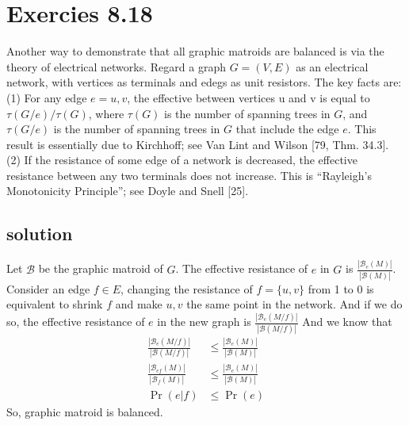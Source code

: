 \documentclass{article}
\begin{document}
\section{Exercies 8.18}
Another way to demonstrate that all graphic matroids are balanced is via the theory of electrical networks. Regard a graph $G = (V, E)$ as an electrical network, with vertices as terminals and edegs as unit resistors. The key facts are: (1) For any edge $e = {u,v}$, the effective between vertices u and v is equal to $\tau(G/e)/\tau(G)$, where $\tau(G)$ is the number of spanning trees in $G$, and $\tau(G/e)$ is the number of spanning trees in $G$ that include the edge $e$. This result is essentially due to Kirchhoff; see Van Lint and Wilson [79, Thm. 34.3]. (2) If the resistance of some edge of a network is decreased, the effective resistance between any two terminals does not increase. This is “Rayleigh’s Monotonicity Principle”; see Doyle and Snell [25].

\subsection{solution}
Let $\mathcal{B}$ be the graphic matroid of $G$.
The effective resistance of $e$ in $G$ is $\frac{|\mathcal{B}_e(M)|}{|\mathcal{B}(M)|}$.
Consider an edge $f\in E$, changing the resistance of $f = \{u, v\}$ from 1 to 0 is equivalent to shrink $f$
and make $u, v$ the same point in the network. And if we do so, the effective resistance of $e$ in the new graph is
$\frac{|\mathcal{B}_e(M/f)|}{|\mathcal{B}(M/f)|}$
And we know that
\begin{align*}
  \frac{|\mathcal{B}_e(M/f)|}{|\mathcal{B}(M/f)|} &\leq \frac{|\mathcal{B}_e(M)|}{|\mathcal{B}(M)|} \\
  \frac{|\mathcal{B}_{ef}(M)|}{|\mathcal{B}_f(M)|} &\leq \frac{|\mathcal{B}_e(M)|}{|\mathcal{B}(M)|} \\
  \Pr(e|f) &\leq \Pr(e)
\end{align*}
So, graphic matroid is balanced.
\end{document}
